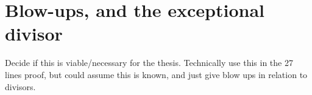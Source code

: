 \section{Blow-ups, and the exceptional divisor}
Decide if this is viable/necessary for the thesis. Technically use this in the 27 lines proof, but could assume this is known, and just give blow ups in relation to divisors.